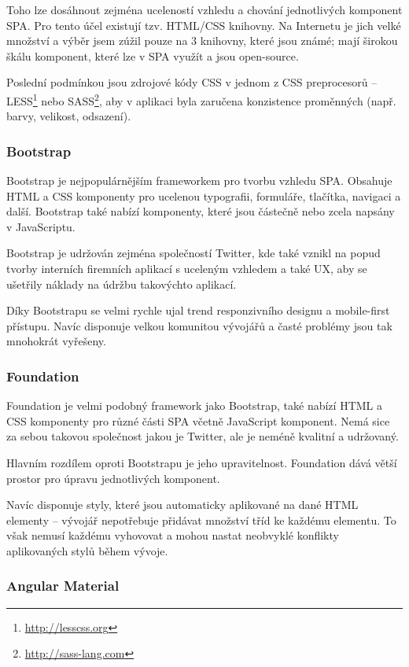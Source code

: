 Toho lze dosáhnout zejména uceleností vzhledu a chování jednotlivých komponent SPA. Pro tento účel existují tzv. HTML/CSS knihovny. Na Internetu je jich velké množství a výběr jsem zúžil pouze na 3 knihovny, které jsou známé; mají širokou škálu komponent, které lze v SPA využít a jsou open-source.

Poslední podmínkou jsou zdrojové kódy CSS v jednom z CSS preprocesorů\cite{css:preproc} -- LESS\footnote{\url{http://lesscss.org}} nebo SASS\footnote{\url{http://sass-lang.com}}, aby v aplikaci byla zaručena konzistence proměnných (např. barvy, velikost, odsazení).

\subsubsection*{Bootstrap}

Bootstrap je nejpopulárnějším frameworkem pro tvorbu vzhledu SPA. Obsahuje HTML a CSS komponenty pro ucelenou typografii, formuláře, tlačítka, navigaci a další. Bootstrap také nabízí komponenty, které jsou částečně nebo zcela napsány v JavaScriptu.

Bootstrap je udržován zejména společností Twitter, kde také vznikl na popud tvorby interních firemních aplikací s uceleným vzhledem a také UX, aby se ušetřily náklady na údržbu takovýchto aplikací.

Díky Bootstrapu se velmi rychle ujal trend responzivního designu a mobile-first přístupu. Navíc disponuje velkou komunitou vývojářů a časté problémy jsou tak mnohokrát vyřešeny.

\subsubsection*{Foundation}

Foundation je velmi podobný framework jako Bootstrap, také nabízí HTML a CSS komponenty pro různé části SPA včetně JavaScript komponent. Nemá sice za sebou takovou společnost jakou je Twitter, ale je neméně kvalitní a udržovaný.

Hlavním rozdílem oproti Bootstrapu je jeho upravitelnost. Foundation dává větší prostor pro úpravu jednotlivých komponent. 

Navíc disponuje styly, které jsou automaticky aplikované na dané HTML elementy -- vývojář nepotřebuje přidávat množství tříd ke každému elementu. To však nemusí každému vyhovovat a mohou nastat neobvyklé konflikty aplikovaných stylů během vývoje.

\subsubsection*{Angular Material}

